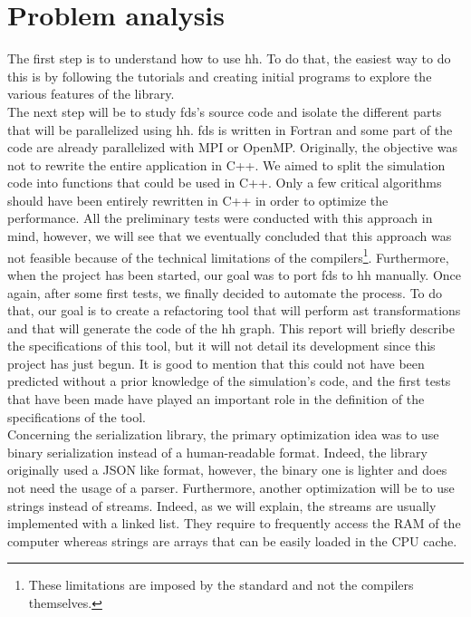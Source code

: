 
\clearpage{}
\section{Problem analysis}

The first step is to understand how to use \gls{hh}. To do that, the easiest way
to do this is by following the tutorials and creating initial programs to
explore the various features of the library.\\

The next step will be to study \gls{fds}'s source code and isolate the different
parts that will be parallelized using \gls{hh}. \gls{fds} is written in Fortran
and some part of the code are already parallelized with MPI or OpenMP.
Originally, the objective was not to rewrite the entire application in C++. We
aimed to split the simulation code into functions that could be used in C++.
Only a few critical algorithms should have been entirely rewritten in C++ in
order to optimize the performance. All the preliminary tests were conducted
with this approach in mind, however, we will see that we eventually concluded
that this approach was not feasible because of the technical limitations of the
compilers\footnote{These limitations are imposed by the standard and not the
compilers themselves.}. Furthermore, when the project has been started, our goal
was to port \gls{fds} to \gls{hh} manually. Once again, after some first tests,
we finally decided to automate the process. To do that, our goal is to create a
refactoring tool that will perform \gls{ast} transformations and that will
generate the code of the \gls{hh} graph. This report will briefly describe the
specifications of this tool, but it will not detail its development since this
project has just begun. It is good to mention that this could not have been
predicted without a prior knowledge of the simulation's code, and the first
tests that have been made have played an important role in the definition of the
specifications of the tool.\\

Concerning the serialization library, the primary optimization idea was to use
binary serialization instead of a human-readable format. Indeed, the library
originally used a JSON like format, however, the binary one is lighter and does
not need the usage of a \gls{parser}. Furthermore, another optimization will be
to use strings instead of streams. Indeed, as we will explain, the streams are
usually implemented with a linked list. They require to frequently access the
RAM of the computer whereas strings are arrays that can be easily loaded in the
CPU cache.\\

